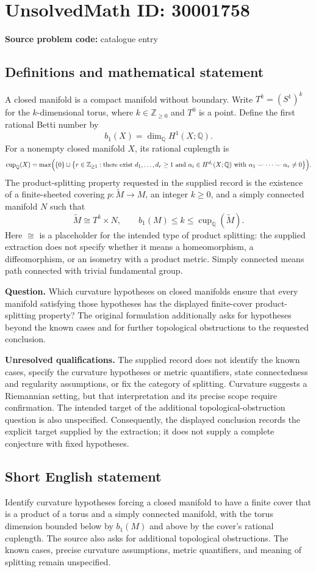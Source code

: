 \documentclass[11pt]{article}
\newcommand{\Z}{\mathbb{Z}}
\newcommand{\Q}{\mathbb{Q}}
\begin{document}
\section*{UnsolvedMath ID: 30001758}
\textbf{Source problem code:} catalogue entry
\subsection{Definitions and mathematical statement}
A closed manifold is a compact manifold without boundary. Write \(T^k=(S^1)^k\) for the \(k\)-dimensional torus, where \(k\in\Z_{\geq 0}\) and \(T^0\) is a point. Define the first rational Betti number by
\[
b_1(X)=\dim_{\Q}H^1(X;\Q).
\]
For a nonempty closed manifold \(X\), its rational cuplength is
\[
\operatorname{cup}_{\Q}(X)=\max\Bigl(\{0\}\cup\bigl\{r\in\Z_{\geq 1}:\text{there exist }d_1,\ldots,d_r\geq 1\text{ and }\alpha_i\in H^{d_i}(X;\Q)\text{ with }\alpha_1\smile\cdots\smile\alpha_r\neq 0\bigr\}\Bigr).
\]
The product-splitting property requested in the supplied record is the existence of a finite-sheeted covering \(p:\widetilde M\to M\), an integer \(k\geq 0\), and a simply connected manifold \(N\) such that
\[
\widetilde M\cong T^k\times N,
\qquad
b_1(M)\leq k\leq\operatorname{cup}_{\Q}(\widetilde M).
\]
Here \(\cong\) is a placeholder for the intended type of product splitting: the supplied extraction does not specify whether it means a homeomorphism, a diffeomorphism, or an isometry with a product metric. Simply connected means path connected with trivial fundamental group.

\textbf{Question.} Which curvature hypotheses on closed manifolds ensure that every manifold satisfying those hypotheses has the displayed finite-cover product-splitting property? The original formulation additionally asks for hypotheses beyond the known cases and for further topological obstructions to the requested conclusion.

\textbf{Unresolved qualifications.} The supplied record does not identify the known cases, specify the curvature hypotheses or metric quantifiers, state connectedness and regularity assumptions, or fix the category of splitting. Curvature suggests a Riemannian setting, but that interpretation and its precise scope require confirmation. The intended target of the additional topological-obstruction question is also unspecified. Consequently, the displayed conclusion records the explicit target supplied by the extraction; it does not supply a complete conjecture with fixed hypotheses.
\subsection{Short English statement}
Identify curvature hypotheses forcing a closed manifold to have a finite cover that is a product of a torus and a simply connected manifold, with the torus dimension bounded below by \(b_1(M)\) and above by the cover's rational cuplength. The source also asks for additional topological obstructions. The known cases, precise curvature assumptions, metric quantifiers, and meaning of splitting remain unspecified.
\end{document}
